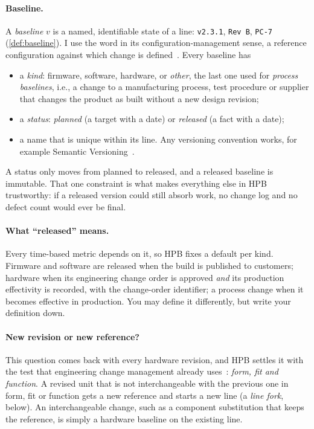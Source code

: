 \paragraph{Baseline.}
A \emph{baseline} $v$ is a named, identifiable state of a line:
\texttt{v2.3.1}, \texttt{Rev~B}, \texttt{PC-7} (\cref{def:baseline}). I
use the word in its configuration-management sense, a reference
configuration against which change is
defined~\citep{ieee828,iso10007}. Every baseline has
\begin{itemize}[leftmargin=1.5em,itemsep=1pt,topsep=2pt]
  \item a \emph{kind}: firmware, software, hardware, or \emph{other}, the
        last one used for \emph{process baselines}, i.e., a change to a
        manufacturing process, test procedure or supplier that changes the
        product as built without a new design revision;
  \item a \emph{status}: \emph{planned} (a target with a date) or
        \emph{released} (a fact with a date);
  \item a name that is unique within its line. Any versioning convention
        works, for example Semantic Versioning~\citep{semver}.
\end{itemize}
A status only moves from planned to released, and a released baseline is
immutable. That one constraint is what makes everything else in HPB
trustworthy: if a released version could still absorb work, no change log
and no defect count would ever be final.

\paragraph{What ``released'' means.}
Every time-based metric depends on it, so HPB fixes a default per kind.
Firmware and software are released when the build is published to
customers; hardware when its engineering change order is approved
\emph{and} its production effectivity is recorded, with the change-order
identifier; a process change when it becomes effective in production. You
may define it differently, but write your definition down.

\paragraph{New revision or new reference?}
This question comes back with every hardware revision, and HPB settles it
with the test that engineering change management already
uses~\citep{jarratt2011ec,stark2015plm}: \emph{form, fit and function}. A
revised unit that is not interchangeable with the previous one in form,
fit or function gets a new reference and starts a new line (a \emph{line
fork}, below). An interchangeable change, such as a component substitution
that keeps the reference, is simply a hardware baseline on the existing
line.

